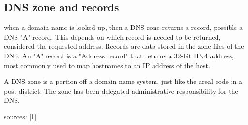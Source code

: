 \subsection{DNS zone and records}
when a domain name is looked up, then a DNS zone returns a record, possible a DNS "A" record. This depends on which record is needed to be returned, considered the requested address. Records are data stored in the zone files of the DNS. An "A" record is a "Address record" that returns a 32-bit IPv4 address, most commonly used to map hostnames to an IP address of the host. 

A DNS zone is a portion off a domain name system, just like the areal code in a post district. The zone has been delegated administrative responsibility for the DNS.

sources:
[1]
